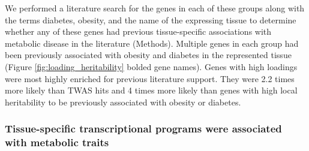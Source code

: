 \documentclass[
]{article}
\begin{document}
We performed a literature search for the genes in each of these groups
along with the terms diabetes, obesity, and the name of the expressing
tissue to determine whether any of these genes had previous
tissue-specific associations with metabolic disease in the literature
(Methods). Multiple genes in each group had been previously associated
with obesity and diabetes in the represented tissue (Figure
\ref{fig:loading_heritability} bolded gene names). Genes with high
loadings were most highly enriched for previous literature support. They
were 2.2 times more likely than TWAS hits and 4 times more likely than
genes with high local heritability to be previously associated with
obesity or diabetes.

\subsubsection{Tissue-specific transcriptional programs were associated
with metabolic
traits}\label{tissue-specific-transcriptional-programs-were-associated-with-metabolic-traits}
\end{document}
